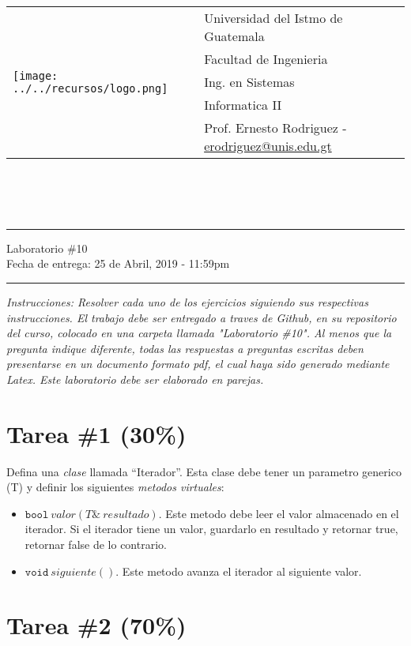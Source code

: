 \documentclass{article}
\newcommand{\horrule}[1]{\rule{\linewidth}{#1}}
\begin{document}
\begin{tabular}{l l}
\multirow{5}{*}{\texttt{[image: ../../recursos/logo.png]}} & Universidad del Istmo de Guatemala \\
 & Facultad de Ingenieria \\
 & Ing. en Sistemas \\
 & Informatica II \\
 & Prof. Ernesto Rodriguez - \href{mailto:erodriguez@unis.edu.gt}{erodriguez@unis.edu.gt} \\
\end{tabular}
\\\\\\

\begin{center}
        \horrule{0.5pt}
        \huge{Laboratorio \#10} \\
        \large{Fecha de entrega: 25 de Abril, 2019 - 11:59pm} \\
        \horrule{1pt}
\end{center}

\emph{Instrucciones: Resolver cada uno de los ejercicios siguiendo sus respectivas
instrucciones. El trabajo debe ser entregado a traves de Github, en su repositorio del curso, colocado en una carpeta llamada "Laboratorio \#10".
Al menos que la pregunta indique diferente, todas las respuestas a preguntas escritas deben presentarse en
un documento formato pdf, el cual haya sido generado mediante Latex. Este laboratorio
debe ser elaborado en parejas.}

\section*{Tarea \#1 (30\%)}
Defina una \emph{clase} llamada ``Iterador''. Esta clase debe tener un parametro
generico (T) y definir los siguientes \emph{metodos virtuales}:
\begin{itemize}
        \item{$\mathtt{bool}\ valor(T\&\ resultado)$. Este metodo debe leer el valor
        almacenado en el iterador. Si el iterador tiene un valor, guardarlo
        en resultado y retornar true, retornar false de lo contrario.}
        \item{$\mathtt{void}\ siguiente()$. Este metodo avanza el iterador
        al siguiente valor.}
\end{itemize}

\section*{Tarea \#2 (70\%)}
\end{document}
